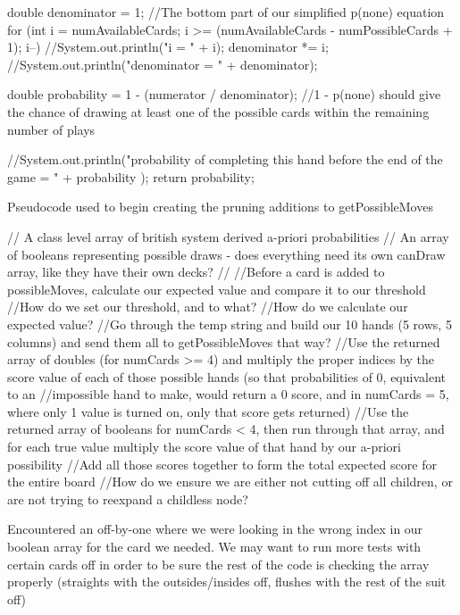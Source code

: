\documentclass[letterpaper]{article}
\begin{document}
double denominator = 1; //The bottom part of our simplified p(none) equation
for (int i = numAvailableCards; i >= (numAvailableCards - numPossibleCards + 1); i--) {
//System.out.println("i = " + i);
denominator *= i;
}
//System.out.println("denominator = " + denominator);
		
double probability = 1 - (numerator / denominator); //1 - p(none) should give the chance of drawing at least one of the possible cards within the remaining number of plays

//System.out.println("probability of completing this hand before the end of the game = " + probability );
return  probability;


Pseudocode used to begin creating the pruning additions to getPossibleMoves

	                  // A class level array of british system derived a-priori probabilities
	                  // An array of booleans representing possible draws - does everything need its own canDraw array, like they have their own decks?
	                  //
	                  //Before a card is added to possibleMoves, calculate our expected value and compare it to our threshold
	                  	//How do we set our threshold, and to what?
	                  	//How do we calculate our expected value?
	                  		//Go through the temp string and build our 10 hands (5 rows, 5 columns) and send them all to getPossibleMoves that way?
	                  		//Use the returned array of doubles (for numCards >= 4) and multiply the proper indices by the score value of each of those possible hands (so that probabilities of 0, equivalent to an
	                  			//impossible hand to make, would return a 0 score, and in numCards = 5, where only 1 value is turned on, only that score gets returned)
	                  		//Use the returned array of booleans for numCards < 4, then run through that array, and for each true value multiply the score value of that hand by our a-priori possibility
	                  		//Add all those scores together to form the total expected score for the entire board
	                  	//How do we ensure we are either not cutting off all children, or are not trying to reexpand a childless node?

	Encountered an off-by-one where we were looking in the wrong index in our boolean array for the card we needed. We may want to run more tests with certain cards off in order to be sure the rest of the code is checking the array properly (straights with the outsides/insides off, flushes with the rest of the suit off)
\end{document}
